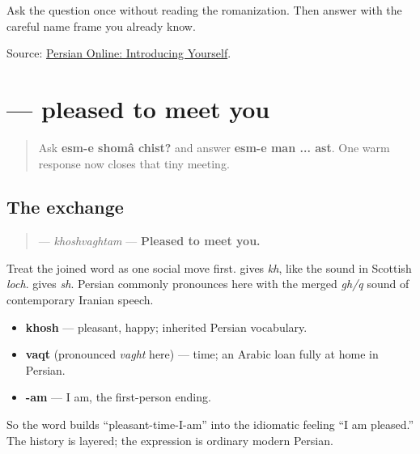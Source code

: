 \begin{tcolorbox}[breakable,colback=teal!4,colframe=teal!35!black,title={Before you move on}]
Ask the question once without reading the romanization. Then answer with the careful name frame you already know.

Source: \href{https://sites.la.utexas.edu/persian\_online\_resources/vocabulary-lists/people-places-and-things/}{Persian Online: Introducing Yourself}.
\end{tcolorbox}
\section[\texorpdfstring{\fa{خوشوقتم} (khoshvaghtam)}{خوشوقتم (khoshvaghtam)}]{ — pleased to meet you}

\label{lesson:FA-C03-khoshvaghtam}



\begin{quote}
Ask \textbf{esm-e shomâ chist?} and answer \textbf{esm-e man ... ast}. One warm response now closes that tiny meeting.
\end{quote}

\subsection*{The exchange}
\begin{quote}
\textbf{} — \emph{khoshvaghtam} — \textbf{Pleased to meet you.}
\end{quote}

Treat the joined word as one social move first. \textbf{} gives \emph{kh}, like the sound in Scottish \emph{loch}. \textbf{} gives \emph{sh}. Persian commonly pronounces \textbf{} here with the merged \emph{gh/q} sound of contemporary Iranian speech.

\begin{cousinweb}
\begin{itemize}
\raggedright
  \item \textbf{khosh} — pleasant, happy; inherited Persian vocabulary.
  \item \textbf{vaqt} (pronounced \emph{vaght} here) — time; an Arabic loan fully at home in Persian.
  \item \textbf{-am} — I am, the first-person ending.
\end{itemize}

So the word builds “pleasant-time-I-am” into the idiomatic feeling “I am pleased.” The history is layered; the expression is ordinary modern Persian.
\end{cousinweb}


